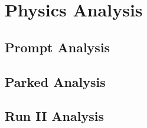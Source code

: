 \chapter{Physics Analysis}

\section{Prompt Analysis}

\section{Parked Analysis}

\section{Run II Analysis}

